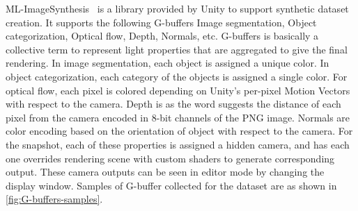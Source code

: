 ML-ImageSynthesis~\cite{imagesynthesis} is a library provided by Unity to support synthetic dataset creation.
It supports the following G-buffers Image segmentation, Object categorization, Optical flow, Depth, Normals, etc.
G-buffers is basically a collective term to represent light properties that are aggregated to give the final rendering.
In image segmentation, each object is assigned a unique color.
In object categorization, each category of the objects is assigned a single color.
For optical flow, each pixel is colored depending on Unity's per-pixel Motion Vectors with respect to the camera.
Depth is as the word suggests the distance of each pixel from the camera encoded in 8-bit channels of the PNG image.
Normals are color encoding based on the orientation of object with respect to the camera.
For the snapshot, each of these properties is assigned a hidden camera, and has each one overrides rendering scene with custom shaders to generate corresponding output.
These camera outputs can be seen in editor mode by changing the display window.
Samples of G-buffer collected for the dataset are as shown in \autoref{fig:G-buffers-samples}.

